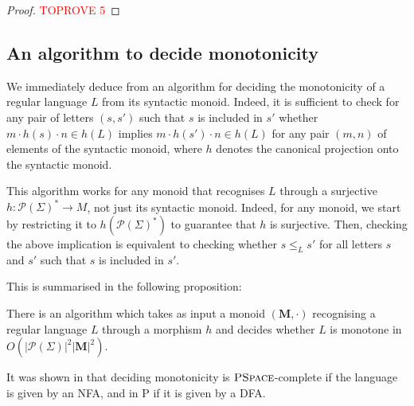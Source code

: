 \documentclass[a4paper,UKenglish,cleveref, autoref, thm-restate]{lipics-v2021}
\renewcommand{\alph}{\part(\Sigma)}
\newcommand{\op}{\cdot}
\renewcommand{\part}{\mathcal{P}}
\newcommand{\M}{\mathbf{M}}
\newcommand{\PSPACE}{\textsc{PSpace}}
\begin{document}
\begin{proof}\textcolor{red}{TOPROVE 5}\end{proof}







\subsection{An algorithm to decide monotonicity} \label{sec:algo}


We immediately deduce from  an algorithm for deciding the monotonicity of a regular language $L$ from its syntactic monoid. Indeed, it is sufficient to check for any pair of letters $(s,s')$ such that $s$ is included in $s'$ whether $m \op h(s) \op n \in h(L)$ implies $m \op h(s') \op n \in h(L)$ for any pair $(m,n)$ of elements of the syntactic monoid, where $h$ denotes the canonical projection onto the syntactic monoid.

This algorithm works for any monoid that recognises $L$ through a surjective $h:\alph^*\to M$, not just its syntactic monoid.
Indeed, for any monoid, we start by restricting it to $h(\alph^*)$ to guarantee that $h$ is surjective.
Then, checking the above implication is equivalent to checking whether $s \leq_L s'$ for all letters $s$ and $s'$ such that $s$ is included in $s'$.
































This is summarised in the following proposition:

\begin{proposition} \label{prop:algo}
    There is an algorithm which takes as input a monoid $(\M,\op)$ recognising a regular language $L$ through a morphism $h$ and decides whether $L$ is monotone in $O(|\alph|^2|\M|^2)$.
\end{proposition}


It was shown in \cite[Thm 2.5]{PFO} that deciding monotonicity is $\PSPACE$-complete if the language is given by an NFA, and in \textsc{P} if it is given by a DFA.
\end{document}
